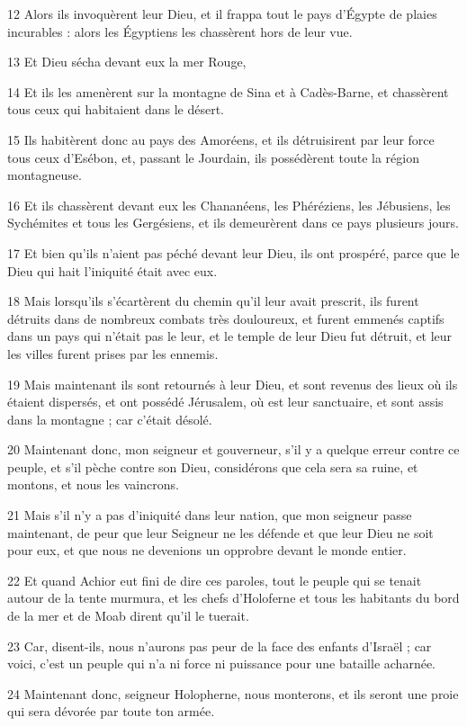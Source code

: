 \par 12 Alors ils invoquèrent leur Dieu, et il frappa tout le pays d'Égypte de plaies incurables : alors les Égyptiens les chassèrent hors de leur vue.
\par 13 Et Dieu sécha devant eux la mer Rouge,
\par 14 Et ils les amenèrent sur la montagne de Sina et à Cadès-Barne, et chassèrent tous ceux qui habitaient dans le désert.
\par 15 Ils habitèrent donc au pays des Amoréens, et ils détruisirent par leur force tous ceux d'Esébon, et, passant le Jourdain, ils possédèrent toute la région montagneuse.
\par 16 Et ils chassèrent devant eux les Chananéens, les Phéréziens, les Jébusiens, les Sychémites et tous les Gergésiens, et ils demeurèrent dans ce pays plusieurs jours.
\par 17 Et bien qu'ils n'aient pas péché devant leur Dieu, ils ont prospéré, parce que le Dieu qui hait l'iniquité était avec eux.
\par 18 Mais lorsqu'ils s'écartèrent du chemin qu'il leur avait prescrit, ils furent détruits dans de nombreux combats très douloureux, et furent emmenés captifs dans un pays qui n'était pas le leur, et le temple de leur Dieu fut détruit, et leur les villes furent prises par les ennemis.
\par 19 Mais maintenant ils sont retournés à leur Dieu, et sont revenus des lieux où ils étaient dispersés, et ont possédé Jérusalem, où est leur sanctuaire, et sont assis dans la montagne ; car c'était désolé.
\par 20 Maintenant donc, mon seigneur et gouverneur, s'il y a quelque erreur contre ce peuple, et s'il pèche contre son Dieu, considérons que cela sera sa ruine, et montons, et nous les vaincrons.
\par 21 Mais s'il n'y a pas d'iniquité dans leur nation, que mon seigneur passe maintenant, de peur que leur Seigneur ne les défende et que leur Dieu ne soit pour eux, et que nous ne devenions un opprobre devant le monde entier.
\par 22 Et quand Achior eut fini de dire ces paroles, tout le peuple qui se tenait autour de la tente murmura, et les chefs d'Holoferne et tous les habitants du bord de la mer et de Moab dirent qu'il le tuerait.
\par 23 Car, disent-ils, nous n'aurons pas peur de la face des enfants d'Israël ; car voici, c'est un peuple qui n'a ni force ni puissance pour une bataille acharnée.
\par 24 Maintenant donc, seigneur Holopherne, nous monterons, et ils seront une proie qui sera dévorée par toute ton armée.

